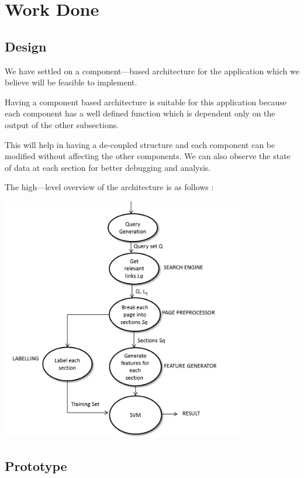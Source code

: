\documentclass[10pt,a4paper]{report}
\begin{document}
\chapter{Work Done}

\section{Design}

We have settled on a component---based architecture for the application which we believe will be feasible to implement. 

Having a component based architecture is suitable for this application because each component has a well defined function which is dependent only on the output of the other subsections. 

This will help in having a de-coupled structure and each component can be modified without affecting the other components. We can also observe the state of data at each section for better debugging and analysis.

The high---level overview of the architecture is as follows : 

\begin{center}
\includegraphics[width=0.80\textwidth]{./architecture}\\
\end{center}

\section{Prototype}
\end{document}
